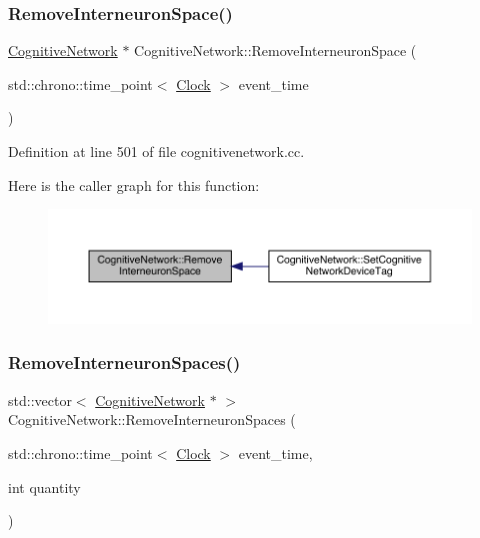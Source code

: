 \subsubsection{\texorpdfstring{Remove\+Interneuron\+Space()}{RemoveInterneuronSpace()}}
{\footnotesize\ttfamily \hyperlink{class_cognitive_network}{Cognitive\+Network} $\ast$ Cognitive\+Network\+::\+Remove\+Interneuron\+Space (\begin{DoxyParamCaption}\item[{std\+::chrono\+::time\+\_\+point$<$ \hyperlink{universe_8h_a0ef8d951d1ca5ab3cfaf7ab4c7a6fd80}{Clock} $>$}]{event\+\_\+time }\end{DoxyParamCaption})}



Definition at line 501 of file cognitivenetwork.\+cc.

Here is the caller graph for this function\+:
\nopagebreak
\begin{figure}[H]
\begin{center}
\leavevmode
\includegraphics[width=350pt]{class_cognitive_network_a04e38cea356f1c7ac31c4df5e19d759c_icgraph}
\end{center}
\end{figure}
\mbox{\label{class_cognitive_network_a994c5f93447a82429809c89aa08d3dc1}} 
\subsubsection{\texorpdfstring{Remove\+Interneuron\+Spaces()}{RemoveInterneuronSpaces()}}
{\footnotesize\ttfamily std\+::vector$<$ \hyperlink{class_cognitive_network}{Cognitive\+Network} $\ast$ $>$ Cognitive\+Network\+::\+Remove\+Interneuron\+Spaces (\begin{DoxyParamCaption}\item[{std\+::chrono\+::time\+\_\+point$<$ \hyperlink{universe_8h_a0ef8d951d1ca5ab3cfaf7ab4c7a6fd80}{Clock} $>$}]{event\+\_\+time,  }\item[{int}]{quantity }\end{DoxyParamCaption})}



